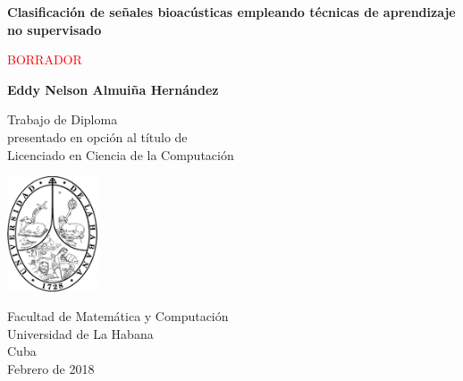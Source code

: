 \documentclass[12pt]{report}
\begin{document}
    \begin{titlepage}
        \begin{center}
            \vspace*{1cm}

            \Huge
            \textbf{Clasificación de señales bioacústicas empleando técnicas de aprendizaje no supervisado}

            \vspace{0.5cm}
            \LARGE
            \textcolor{red}{BORRADOR}

            \vspace{1.5cm}

            \textbf{Eddy Nelson Almuiña Hernández}

            \vfill

            Trabajo de Diploma\\
            presentado en opción al título de\\
            Licenciado en Ciencia de la Computación\\

            \vspace{0.8cm}

            \includegraphics[width=0.2\textwidth]{uh.png}

            \Large
            Facultad de Matemática y Computación\\
            Universidad de La Habana\\
            Cuba\\
            Febrero de 2018
        \end{center}
    \end{titlepage}
\end{document}
